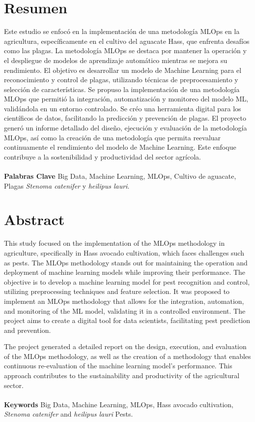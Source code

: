 \thispagestyle{empty}
\section*{Resumen}
Este estudio se enfocó en la implementación de una metodología MLOps en la agricultura, específicamente en el cultivo del aguacate Hass, que enfrenta desafíos como las plagas. La metodología MLOps se destaca por mantener la operación y el despliegue de modelos de aprendizaje automático mientras se mejora su rendimiento. El objetivo es desarrollar un modelo de Machine Learning para el reconocimiento y control de plagas, utilizando técnicas de preprocesamiento y selección de características. Se propuso la implementación de una metodología MLOps que permitió la integración, automatización y monitoreo del modelo ML, validándola en un entorno controlado. Se créo una herramienta digital para los científicos de datos, facilitando la predicción y prevención de plagas. El proyecto generó un informe detallado del diseño, ejecución y evaluación de la metodología MLOps, así como la creación de una metodología que permita reevaluar continuamente el rendimiento del modelo de Machine Learning. Este enfoque contribuye a la sostenibilidad y productividad del sector agrícola.


\paragraph*{}{\textbf{Palabras Clave}} Big Data, Machine Learning, MLOps, Cultivo de
aguacate, Plagas \textit{Stenoma catenifer} y \textit{heilipus lauri}.

\section*{Abstract}
This study focused on the implementation of the MLOps methodology in agriculture, specifically in Hass avocado cultivation, which faces challenges such as pests. The MLOps methodology stands out for maintaining the operation and deployment of machine learning models while improving their performance. The objective is to develop a machine learning model for pest recognition and control, utilizing preprocessing techniques and feature selection. It was proposed to implement an MLOps methodology that allows for the integration, automation, and monitoring of the ML model, validating it in a controlled environment. The project aims to create a digital tool for data scientists, facilitating pest prediction and prevention. 

\newpage
\thispagestyle{empty}
The project generated a detailed report on the design, execution, and evaluation of the MLOps methodology, as well as the creation of a methodology that enables continuous re-evaluation of the machine learning model's performance. This approach contributes to the sustainability and productivity of the agricultural sector.
\paragraph*{}{\textbf{Keywords}} Big Data, Machine Learning, MLOps, Hass avocado cultivation, \textit{Stenoma catenifer} and \textit{heilipus lauri} Pests.
